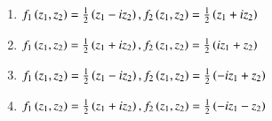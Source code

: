 \documentclass[journal]{IEEEtran}
\begin{document}
\begin{enumerate}[start=1]
\begin{enumerate}
    \item $f_1\left(z_1,z_2\right)=\frac{1}{2}\left(z_1-iz_2\right),f_2\left(z_1,z_2\right)=\frac{1}{2}\left(z_1+iz_2\right)$
    \item $f_1\left(z_1,z_2\right)=\frac{1}{2}\left(z_1+iz_2\right),f_2\left(z_1,z_2\right)=\frac{1}{2}\left(iz_1+z_2\right)$
    \item $f_1\left(z_1,z_2\right)=\frac{1}{2}\left(z_1-iz_2\right),f_2\left(z_1,z_2\right)=\frac{1}{2}\left(-iz_1+z_2\right)$
    \item $f_1\left(z_1,z_2\right)=\frac{1}{2}\left(z_1+iz_2\right),f_2\left(z_1,z_2\right)=\frac{1}{2}\left(-iz_1-z_2\right)$
\end{enumerate}
\end{enumerate}
\end{document}
